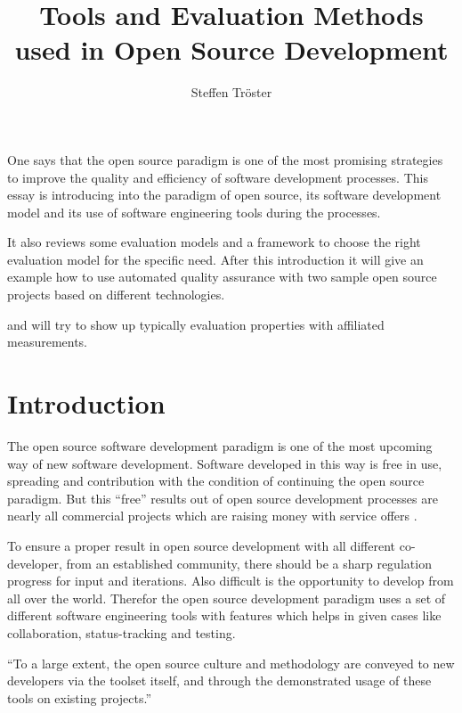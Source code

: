 \documentclass[DIV=calc,paper=a4,fontsize=9pt,twocolumn]{scrartcl}
\title{Tools and Evaluation Methods used in Open Source Development}
\author{Steffen Tröster \\}
\date{}
\newcommand{\initial}[1]{
     \lettrine[lines=2,lhang=0.3,nindent=0em]{
                    \color{headblue}
                    {\textsf{#1}}}{}}
\begin{document}
\maketitle
\thispagestyle{fancy}		

\initial{O}ne says that the open source paradigm is one of the most promising strategies to improve the quality and efficiency of software development processes. This essay is introducing into the paradigm of open source, its software development model and its use of software engineering tools during the processes.

It also reviews some evaluation models and a framework to choose the right evaluation model for the specific need. After this introduction it will give an example how to use automated quality assurance with two sample open source projects based on different technologies.

\citet{fuggetta2003open} and will try to show up typically evaluation properties with affiliated measurements.

\section{Introduction}

The open source software development paradigm is one of the most upcoming way of new software development. Software developed in this way is free in use, spreading and contribution with the condition of continuing the open source paradigm. But this \enquote{free} results out of open source development processes are nearly all commercial projects which are raising money with service offers \citep{Wheeler}.

To ensure a proper result in open source development with all different co-developer, from an established community, there should be a sharp regulation progress for input and iterations. Also difficult is the opportunity to develop from all over the world. Therefor the open source development paradigm uses a set of different software engineering tools with features which helps in given cases like collaboration, status-tracking and testing.

\enquote{To a large extent, the open source culture and methodology are conveyed to new developers via the toolset itself, and through the demonstrated usage of these tools on existing projects.} \citep{Robbins02adoptingoss}
\end{document}
